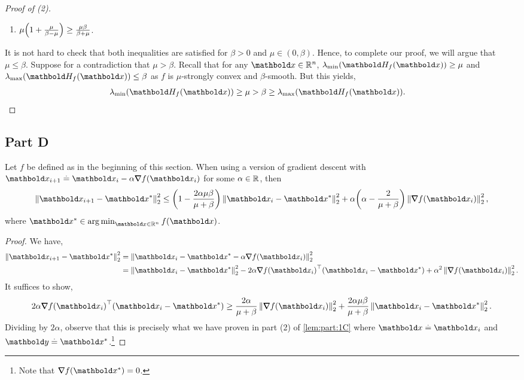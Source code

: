 \documentclass{tufte-handout}
\begin{document}
\begin{proof}[Proof of (2)]
\begin{enumerate}
    \item $\mu\parentheses*{1 + \frac{\mu}{\beta - \mu}} \geq \frac{\mu\beta}{\beta + \mu}$.
\end{enumerate} It is not hard to check that both inequalities are satisfied for $\beta > 0$ and $\mu \in (0, \beta)$. Hence, to complete our proof, we will argue that $\mu \leq \beta$. Suppose for a contradiction that $\mu > \beta$. Recall that for any $\vx \in \R^n$, $\lmin(\mH_f(\vx)) \geq \mu$ and $\lmax(\mH_f(\vx)) \leq \beta$ as $f$ is $\mu$-strongly convex and $\beta$-smooth. But this yields, \begin{align*}
    \lmin(\mH_f(\vx)) \geq \mu > \beta \geq \lmax(\mH_f(\vx)). &\qedhere
\end{align*}
\end{proof}

\subsection{Part D}
\begin{lem}\label{lem:part:1D}
Let $f$ be defined as in the beginning of this section. When using a version of gradient descent with $\vx_{i+1} \defeq \vx_i - \alpha \grad f(\vx_i)$ for some $\alpha \in \mathbb{R}$, then \begin{align}
    \norm{\vx_{i+1} - \s{\vx}}_2^2 \leq \parentheses*{1-\frac{2\alpha\mu\beta}{\mu + \beta}}\norm{\vx_i - \s{\vx}}_2^2 + \alpha\parentheses*{\alpha - \frac{2}{\mu + \beta}}\norm{\grad f(\vx_i)}_2^2, \label{eq:part:1D}
\end{align} where $\s{\vx} \in \argmin_{\vx \in \R^n} f(\vx)$.
\end{lem}
\begin{proof} We have, \begin{align*}
    \norm{\vx_{i+1} - \s{\vx}}_2^2 &= \norm{\vx_i - \s{\vx} - \alpha \grad f(\vx_i)}_2^2 \\
    &= \norm{\vx_i - \s{\vx}}_2^2 - 2\alpha\trans{\grad f(\vx_i)}(\vx_i - \s{\vx}) + \alpha^2\norm{\grad f(\vx_i)}_2^2.
\end{align*} It suffices to show, \begin{align*}
    2\alpha\trans{\grad f(\vx_i)}(\vx_i - \s{\vx}) \geq \frac{2\alpha}{\mu + \beta}\norm{\grad f(\vx_i)}_2^2 + \frac{2\alpha\mu\beta}{\mu + \beta}\norm{\vx_i - \s{\vx}}_2^2.
\end{align*} Dividing by $2\alpha$, observe that this is precisely what we have proven in part (2) of \cref{lem:part:1C} where $\vx \defeq \vx_i$ and $\vy \defeq \s{\vx}$.\footnote{Note that $\grad f(\s{\vx}) = 0$.}
\end{proof}
\end{document}
